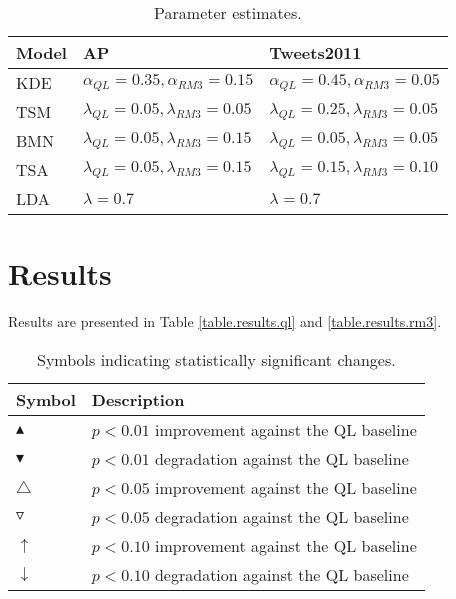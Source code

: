 \documentclass{sig-alternate}
\begin{document}
\begin{table}[htdp]
\small
\caption{Parameter estimates. }
\begin{center}
\begin{tabular}{| l | l | l |}
\hline
\bf{Model}& \bf{AP} 								&  \bf{Tweets2011}\\ \hline 
KDE 	& $\alpha_{QL} = 0.35, \alpha_{RM3} = 0.15$ 		& $\alpha_{QL} = 0.45, \alpha_{RM3} = 0.05$ \\
TSM 	& $\lambda_{QL} = 0.05, \lambda_{RM3} = 0.05$ 	& $\lambda_{QL} = 0.25, \lambda_{RM3} = 0.05$ \\ 
BMN 	& $\lambda_{QL} = 0.05, \lambda_{RM3} = 0.15$ 	& $\lambda_{QL} = 0.05, \lambda_{RM3} = 0.05$ \\ 
TSA 		& $\lambda_{QL} = 0.05, \lambda_{RM3} = 0.15$ 	& $\lambda_{QL} = 0.15, \lambda_{RM3} = 0.10$ \\ 
LDA 		& $\lambda = 0.7$							& $\lambda = 0.7 $ \\ \hline
\end{tabular}
\end{center}
\label{table.params}
\normalsize
\end{table}


\section{Results}

Results are presented in Table \ref{table.results.ql} and \ref{table.results.rm3}.

\begin{table}[htdp]
\small
\caption{Symbols indicating statistically significant changes. }
\begin{center}
\begin{tabular}{l | l }
\hline
\bf{Symbol}		& \bf{Description}\\ \hline 
$\blacktriangle$		&	$p < 0.01$ improvement against the QL baseline \\
$\blacktriangledown$	&	$p < 0.01$ degradation against the QL baseline \\
$\triangle$			&	$p < 0.05$ improvement against the QL baseline \\
$\triangledown$		&	$p < 0.05$ degradation against the QL baseline \\
$\uparrow$			&	$p < 0.10$ improvement against the QL baseline \\
$\downarrow$			&	$p < 0.10$ degradation against the QL baseline \\
\end{tabular}
\end{center}
\label{table.pval}
\normalsize
\end{table}
\end{document}
